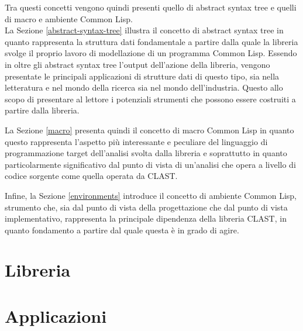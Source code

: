 \documentclass{book}
\begin{document}
Tra questi concetti vengono quindi presenti quello di abstract syntax tree e
quelli di macro e ambiente Common Lisp.\\

La Sezione \ref{abstract-syntax-tree} illustra il concetto di abstract syntax
tree in quanto rappresenta la struttura dati fondamentale a partire dalla quale
la libreria svolge il proprio lavoro di modellazione di un programma Common
Lisp. Essendo in oltre gli abstract syntax tree l'output dell'azione della
libreria, vengono presentate le principali applicazioni di strutture dati di
questo tipo, sia nella letteratura e nel mondo della ricerca sia nel mondo
dell'industria. Questo allo scopo di presentare al lettore i potenziali
strumenti che possono essere costruiti a partire dalla libreria.

La Sezione \ref{macro} presenta quindi il concetto di macro Common Lisp in
quanto questo rappresenta l'aspetto più interessante e peculiare del linguaggio
di programmazione target dell'analisi svolta dalla libreria e soprattutto in
quanto particolarmente significativo dal punto di vista di un'analisi che opera
a livello di codice sorgente come quella operata da CLAST.

Infine, la Sezione \ref{environments} introduce il concetto di ambiente Common
Lisp, strumento che, sia dal punto di vista della progettazione che dal punto di
vista implementativo, rappresenta la principale dipendenza della libreria CLAST,
in quanto fondamento a partire dal quale questa è in grado di agire.






\endgroup

\chapter{Libreria}
\label{library}





\chapter{Applicazioni}
\label{applications}

\end{document}
